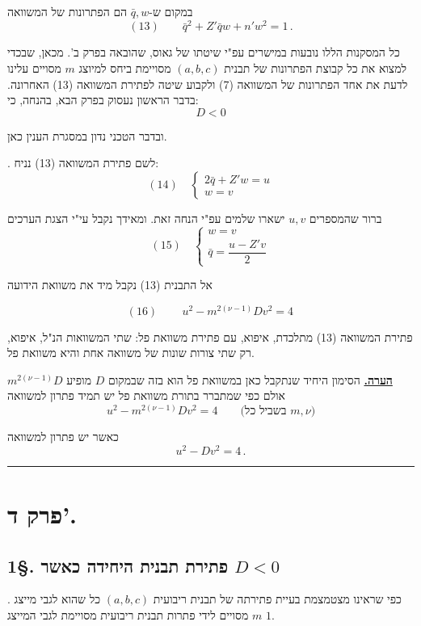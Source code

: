\noindent במקום ש-$\bar{q}, w$ הם הפתרונות של המשוואה
\[ (13) \qquad \bar{q}^2 + Z'\bar{q}w + n'w^2 = 1 \, . \]

\noindent כל המסקנות הללו נובעות במישרים עפ"י שיטתו של גאוס, שהובאה
בפרק ב'. מכאן, שבכדי למצוא את כל קבוצת הפתרונות של תבנית
$(a,b,c)$ מסויימת ביחס למיוצג $m$ מסויים עלינו לדעת את
אחד הפתרונות של המשוואה (7) ולקבוע שיטה לפתירת המשוואה (13)
האחרונה. בדבר הראשון נעסוק בפרק הבא, בהנחה, כי:
\[ D < 0 \]

\noindent ובדבר הטכני נדון במסגרת הענין כאן.

\medskip
{}. לשם פתירת המשוואה (13) נניח:
\[ (14) \quad \left\{ \begin{array}{l}
2\bar{q} + Z'w = u \\
w = v
\end{array} \right. \]

\noindent ברור שהמספרים $u, v$ ישארו שלמים עפ"י הנחה זאת. ומאידך נקבל
עי"י הצגת הערכים
\[ (15) \quad \left\{ \begin{array}{l}
w = v \\[4pt]
\bar{q} = \dfrac{u - Z'v}{2}
\end{array} \right. \]

\noindent אל התבנית (13) נקבל מיד את משוואת הידועה

\[ (16) \qquad \boxed{\, u^2 - m^{2(\nu-1)}Dv^2 = 4 \,} \]

\noindent פתירת המשוואה (13) מתלכדת, איפוא, עם פתירת משוואת פל: שתי
המשוואות הנ"ל, איפוא, רק שתי צורות שונות של משוואה אחת
והיא משוואת פל.

\bigskip
\noindent\textbf{\underline{הערה.}} הסימון היחיד שנתקבל כאן במשוואת פל הוא בזה שבמקום $D$
מופיע $m^{2(\nu-1)}D$ אולם כפי שמתברר בתורת משוואת פל יש תמיד
פתרון למשוואה
\[ u^2 - m^{2(\nu-1)}Dv^2 = 4 \qquad \text{(בשביל כל } m, \nu \text{)} \]

\noindent כאשר יש פתרון למשוואה
\[ u^2 - Dv^2 = 4 \, . \]

\bigskip
\hrule
\bigskip

\section*{פרק ד'.}

\subsection*{1\S. פתירת תבנית היחידה כאשר $D < 0$}

. כפי שראינו מצטמצמת בעיית פתירתה של תבנית ריבועית $(a,b,c)$
כל שהוא לגבי מייצג $m$ מסויים לידי פתרות תבנית ריבועית מסויימת
לגבי המייצג $1$.

